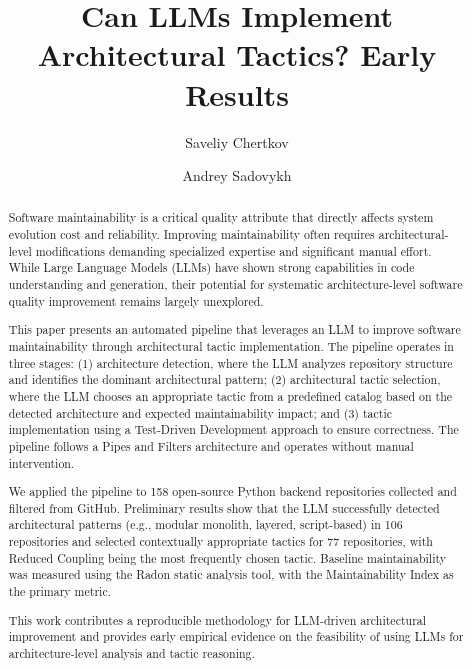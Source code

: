 \documentclass[sigconf,review]{acmart}
\begin{document}
\title{Can LLMs Implement Architectural Tactics? Early Results}

\author{Saveliy Chertkov}

\author{Andrey Sadovykh}

\begin{abstract}

Software maintainability is a critical quality attribute that directly affects system evolution cost and reliability. Improving maintainability often requires architectural-level modifications demanding specialized expertise and significant manual effort. While Large Language Models (LLMs) have shown strong capabilities in code understanding and generation, their potential for systematic architecture-level software quality improvement remains largely unexplored.

This paper presents an automated pipeline that leverages an LLM to improve software maintainability through architectural tactic implementation. The pipeline operates in three stages: (1) architecture detection, where the LLM analyzes repository structure and identifies the dominant architectural pattern; (2) architectural tactic selection, where the LLM chooses an appropriate tactic from a predefined catalog based on the detected architecture and expected maintainability impact; and (3) tactic implementation using a Test-Driven Development approach to ensure correctness. The pipeline follows a Pipes and Filters architecture and operates without manual intervention.

We applied the pipeline to 158 open-source Python backend repositories collected and filtered from GitHub. Preliminary results show that the LLM successfully detected architectural patterns (e.g., modular monolith, layered, script-based) in 106 repositories and selected contextually appropriate tactics for 77 repositories, with Reduced Coupling being the most frequently chosen tactic. Baseline maintainability was measured using the Radon static analysis tool, with the Maintainability Index as the primary metric.

This work contributes a reproducible methodology for LLM-driven architectural improvement and provides early empirical evidence on the feasibility of using LLMs for architecture-level analysis and tactic reasoning.


\end{abstract}
\end{document}
